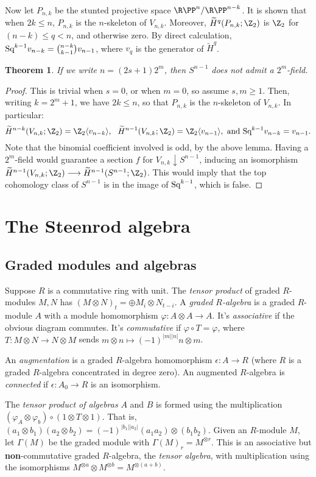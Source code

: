 \documentclass[11pt]{article}
\renewcommand{\phi}{\varphi}
\newcommand{\Squ}{\textup{Sq}}
\theoremstyle{plain}
\newtheorem*{thm*}{Theorem}
\theoremstyle{definition}
\renewcommand{\to}{\longrightarrow}
\renewcommand{\mapsto}{\longmapsto}
\newcommand{\RP}{{\R\PP}}
\begin{document}
Now let $P_{n,k}$ be the stunted projective space $\RP^n/\RP^{n-k}$. It is shown that when $2k\leq n$, $P_{n,k}$ is the $n$-skeleton of $V_{n,k}$. Moreover, $\widetilde H^q(P_{n,k};\Z_2)$ is $\Z_2$ for $(n-k)\leq q<n$, and otherwise zero. By direct calculation, $\Squ^{k-1}v_{n-k}={n-k\choose k-1}v_{n-1}$, where $v_q$ is the generator of $\widetilde H^q$.
\begin{thm*}
If we write $n=(2s+1)2^m$, then $S^{n-1}$ does not admit a $2^m$-field.
\end{thm*}
\begin{proof}
This is trivial when $s=0$, or when $m=0$, so assume $s,m\geq1$. Then, writing $k=2^m+1$, we have $2k\leq n$, so that $P_{n,k}$ is the $n$-skeleton of $V_{n,k}$. In particular: \[\widetilde H^{n-k}(V_{n,k};\Z_2)=\Z_2\langle v_{n-k}\rangle,\ \ \widetilde H^{n-1}(V_{n,k};\Z_2)=\Z_2\langle v_{n-1}\rangle,\text{ and }\Squ^{k-1}v_{n-k}=v_{n-1}.\]
Note that the binomial coefficient involved is odd, by the above lemma.
Having a $2^m$-field would guarantee a section $f$ for $V_{n,k}\downarrow S^{n-1}$, inducing an  isomorphism $\widetilde H^{n-1}(V_{n,k};\Z_2)\to\widetilde H^{n-1}(S^{n-1};\Z_2)$. This would imply that the top cohomology class of $S^{n-1}$ is in the image of $\Squ^{k-1}$, which is false.
\end{proof}

\section{The Steenrod algebra}
\subsection{Graded modules and algebras}
Suppose $R$ is a commutative ring with unit. The \emph{tensor product} of graded $R$-modules $M,N$ has $(M\otimes N)_t=\oplus M_{i}\otimes N_{t-i}$. A \emph{graded $R$-algebra} is a graded $R$-module $A$ with a module homomorphism $\phi:A\otimes A\to A$. It's \emph{associative} if the obvious diagram commutes. It's \emph{commutative} if $\phi\circ T=\phi$, where $T:M\otimes N\to N\otimes M$ sends $m\otimes n\mapsto (-1)^{|m||n|}n\otimes m$.

An \emph{augmentation} is a graded $R$-algebra homomorphism $\epsilon:A\to R$ (where $R$ is a graded $R$-algebra concentrated in degree zero). An augmented $R$-algebra is \emph{connected} if $\epsilon:A_0\to R$ is an isomorphism.

The \emph{tensor product of algebras} $A$ and $B$ is formed using the multiplication $(\phi_A\otimes\phi_b)\circ(1\otimes T\otimes 1)$. That is, $(a_1\otimes b_1)(a_2\otimes b_2)=(-1)^{|b_1||a_2|}(a_1a_2)\otimes(b_1b_2)$. Given an $R$-module $M$, let $\Gamma(M)$ be the graded module with $\Gamma(M)_r=M^{\otimes r}$. This is an associative but \textbf{non}-commutative graded $R$-algebra, the \emph{tensor algebra}, with multiplication using the isomorphisms $M^{\otimes a}\otimes M^{\otimes b}=M^{\otimes (a+b)}$.
\end{document}
